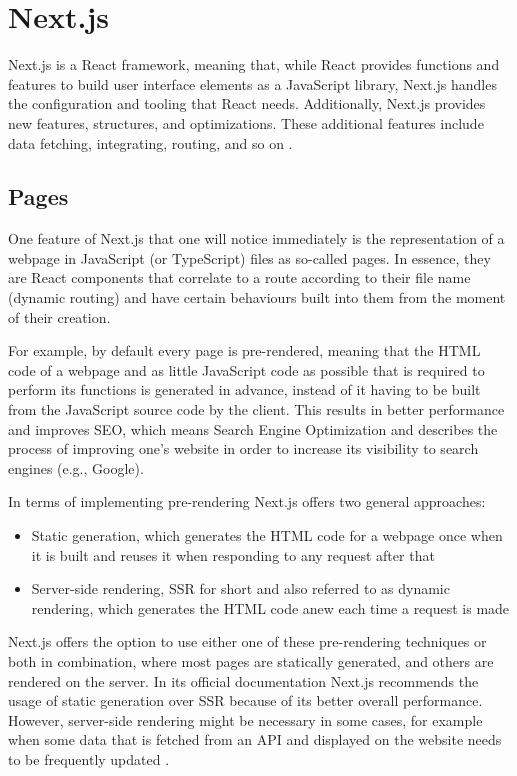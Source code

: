\section{Next.js}
Next.js is a React framework, meaning that, while React provides functions and features to build user interface elements
as a JavaScript library, Next.js handles the configuration and tooling that React needs. Additionally, Next.js provides
new features, structures, and optimizations. These additional features include data fetching, integrating, routing,
and so on \cite{NextjsDescription}.
\\
\subsection{Pages}
One feature of Next.js that one will notice immediately is the representation of a webpage in JavaScript (or TypeScript) files as
so-called pages. In essence, they are React components that correlate to a route according to their file name (dynamic routing) and
have certain behaviours built into them from the moment of their creation.

For example, by default every page is pre-rendered, meaning that the HTML code of a webpage and as little JavaScript code as possible
that is required to perform its functions is generated in advance, instead of it having to be built from the JavaScript source code by
the client. This results in better performance and improves SEO, which means Search Engine Optimization and describes the process
of improving one's website in order to increase its visibility to search engines (e.g., Google).

In terms of implementing pre-rendering Next.js offers two general approaches: 
\begin{itemize}
  \item Static generation, which generates the HTML code for a webpage once when it is built and reuses it when responding to any request after that
  \item Server-side rendering, SSR for short and also referred to as dynamic rendering, which generates the HTML code anew each time a request is made
\end{itemize}

Next.js offers the option to use either one of these pre-rendering
techniques or both in combination, where most pages are statically generated, and others are rendered on the server. In its official
documentation Next.js recommends the usage of static generation over SSR because of its better overall performance. However, server-side
rendering might be necessary in some cases, for example when some data that is fetched from an API and displayed on the website needs
to be frequently updated \cite{NextjsPages}.
\\
